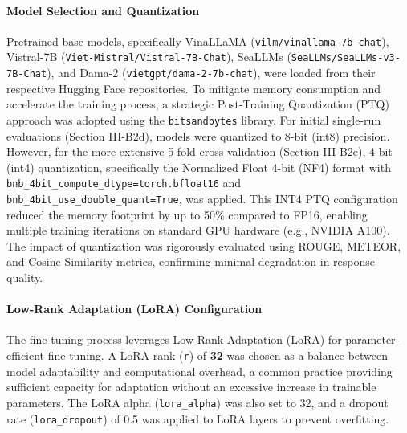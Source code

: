 \documentclass[conference]{IEEEtran}
\begin{document}
\paragraph{Model Selection and Quantization}
Pretrained base models, specifically VinaLLaMA (\texttt{vilm/vinallama-7b-chat}), Vistral-7B (\texttt{Viet-Mistral/Vistral-7B-Chat}), SeaLLMs (\texttt{SeaLLMs/SeaLLMs-v3-7B-Chat}), and Dama-2 (\texttt{vietgpt/dama-2-7b-chat}), were loaded from their respective Hugging Face repositories. To mitigate memory consumption and accelerate the training process, a strategic Post-Training Quantization (PTQ) approach was adopted using the \texttt{bitsandbytes} library. For initial single-run evaluations (Section III-B2d), models were quantized to 8-bit (int8) precision. However, for the more extensive 5-fold cross-validation (Section III-B2e), 4-bit (int4) quantization, specifically the Normalized Float 4-bit (NF4) format with \texttt{bnb\_4bit\_compute\_dtype=torch.bfloat16} and \texttt{bnb\_4bit\_use\_double\_quant=True}, was applied. This INT4 PTQ configuration reduced the memory footprint by up to 50\% compared to FP16, enabling multiple training iterations on standard GPU hardware (e.g., NVIDIA A100). The impact of quantization was rigorously evaluated using ROUGE, METEOR, and Cosine Similarity metrics, confirming minimal degradation in response quality.
\paragraph{Low-Rank Adaptation (LoRA) Configuration}
The fine-tuning process leverages Low-Rank Adaptation (LoRA) \cite{b7} for parameter-efficient fine-tuning. A LoRA rank (\texttt{r}) of \textbf{32} was chosen as a balance between model adaptability and computational overhead, a common practice providing sufficient capacity for adaptation without an excessive increase in trainable parameters. The LoRA alpha (\texttt{lora\_alpha}) was also set to 32, and a dropout rate (\texttt{lora\_dropout}) of 0.5 was applied to LoRA layers to prevent overfitting.
\end{document}
